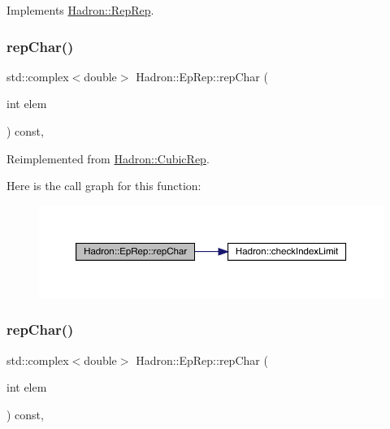 Implements \mbox{\hyperlink{structHadron_1_1RepRep_ab3213025f6de249f7095892109575fde}{Hadron\+::\+Rep\+Rep}}.

\mbox{\label{structHadron_1_1EpRep_a87fd401f4263b709af08948c9452a717}} 
\subsubsection{\texorpdfstring{repChar()}{repChar()}\hspace{0.1cm}{\footnotesize\ttfamily [1/2]}}
{\footnotesize\ttfamily std\+::complex$<$double$>$ Hadron\+::\+Ep\+Rep\+::rep\+Char (\begin{DoxyParamCaption}\item[{int}]{elem }\end{DoxyParamCaption}) const\hspace{0.3cm}{\ttfamily [inline]}, {\ttfamily [virtual]}}



Reimplemented from \mbox{\hyperlink{structHadron_1_1CubicRep_af45227106e8e715e84b0af69cd3b36f8}{Hadron\+::\+Cubic\+Rep}}.

Here is the call graph for this function\+:
\nopagebreak
\begin{figure}[H]
\begin{center}
\leavevmode
\includegraphics[width=350pt]{d7/da2/structHadron_1_1EpRep_a87fd401f4263b709af08948c9452a717_cgraph}
\end{center}
\end{figure}
\mbox{\label{structHadron_1_1EpRep_a87fd401f4263b709af08948c9452a717}} 
\subsubsection{\texorpdfstring{repChar()}{repChar()}\hspace{0.1cm}{\footnotesize\ttfamily [2/2]}}
{\footnotesize\ttfamily std\+::complex$<$double$>$ Hadron\+::\+Ep\+Rep\+::rep\+Char (\begin{DoxyParamCaption}\item[{int}]{elem }\end{DoxyParamCaption}) const\hspace{0.3cm}{\ttfamily [inline]}, {\ttfamily [virtual]}}



